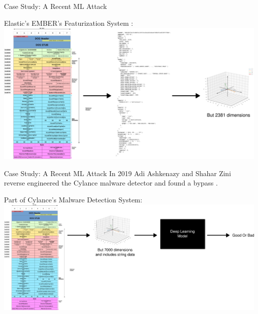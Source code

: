 \documentclass{beamer}
\begin{document}
\begin{frame}{Case Study: A Recent ML Attack}
    \begin{center}
        Elastic's EMBER's Featurization System \cite{anderson2018ember}:
        \includegraphics[scale=0.18]{ember_diagram.png}
    \end{center}
\end{frame}

\begin{frame}{Case Study: A Recent ML Attack}
    In 2019 Adi Ashkenazy and Shahar Zini reverse engineered the Cylance malware detector and found a bypass \cite{cylance_i_kill_you}.
    \vspace{10pt}
    \begin{center}
        Part of Cylance's Malware Detection System:
        \includegraphics[scale=0.15]{cylance_diagram1.png}
    \end{center}
\end{frame}
\end{document}
